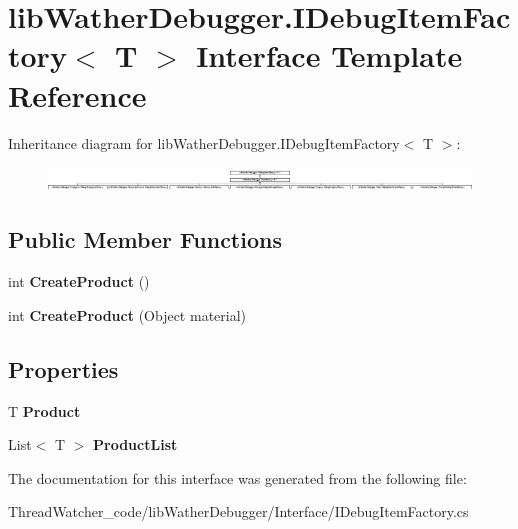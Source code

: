 \hypertarget{interfacelib_wather_debugger_1_1_i_debug_item_factory_3_01_t_01_4}{\section{lib\+Wather\+Debugger.\+I\+Debug\+Item\+Factory$<$ T $>$ Interface Template Reference}
\label{interfacelib_wather_debugger_1_1_i_debug_item_factory_3_01_t_01_4}
}
Inheritance diagram for lib\+Wather\+Debugger.\+I\+Debug\+Item\+Factory$<$ T $>$\+:\begin{figure}[H]
\begin{center}
\leavevmode
\includegraphics[height=0.645161cm]{interfacelib_wather_debugger_1_1_i_debug_item_factory_3_01_t_01_4}
\end{center}
\end{figure}
\subsection*{Public Member Functions}
\begin{DoxyCompactItemize}
\item 
\hypertarget{interfacelib_wather_debugger_1_1_i_debug_item_factory_3_01_t_01_4_ae5b174533efa0f35465d55c0ff1ebff5}{int {\bfseries Create\+Product} ()}\label{interfacelib_wather_debugger_1_1_i_debug_item_factory_3_01_t_01_4_ae5b174533efa0f35465d55c0ff1ebff5}

\item 
\hypertarget{interfacelib_wather_debugger_1_1_i_debug_item_factory_3_01_t_01_4_a3a7aabb670a54a038bbe0bf412a8e459}{int {\bfseries Create\+Product} (Object material)}\label{interfacelib_wather_debugger_1_1_i_debug_item_factory_3_01_t_01_4_a3a7aabb670a54a038bbe0bf412a8e459}

\end{DoxyCompactItemize}
\subsection*{Properties}
\begin{DoxyCompactItemize}
\item 
\hypertarget{interfacelib_wather_debugger_1_1_i_debug_item_factory_3_01_t_01_4_aeef1b8af7808dd46fbdbd50129a2401a}{T {\bfseries Product}}\label{interfacelib_wather_debugger_1_1_i_debug_item_factory_3_01_t_01_4_aeef1b8af7808dd46fbdbd50129a2401a}

\item 
\hypertarget{interfacelib_wather_debugger_1_1_i_debug_item_factory_3_01_t_01_4_a42530deb6b2a6f7e8b4f1c6dead17091}{List$<$ T $>$ {\bfseries Product\+List}}\label{interfacelib_wather_debugger_1_1_i_debug_item_factory_3_01_t_01_4_a42530deb6b2a6f7e8b4f1c6dead17091}

\end{DoxyCompactItemize}


The documentation for this interface was generated from the following file\+:\begin{DoxyCompactItemize}
\item 
Thread\+Watcher\+\_\+code/lib\+Wather\+Debugger/\+Interface/I\+Debug\+Item\+Factory.\+cs\end{DoxyCompactItemize}
